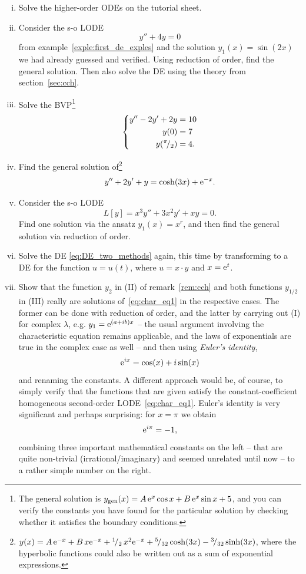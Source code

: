 \begin{exercise}
\begin{enumerate}[(i)]
		\item Solve the higher-order ODEs on the tutorial sheet.
		\item Consider the s-o LODE	\[y''+4y=0\]
		from example~\ref{exple:first_de_exples} and the solution $y_1(x)=\sin(2x)$ we had already guessed and verified. Using reduction of order, find the general solution. Then also solve the DE using the theory from section~\ref{sec:cch}.
		\item Solve the BVP\footnote{The general solution is $y_{\text{gen}}(x)= A \, \mathrm{e}^x \cos x + B \, \mathrm{e}^x \sin x + 5$, and you can verify the constants you have found for the particular solution by checking whether it satisfies the boundary conditions.} 
		\[ \left\{\begin{split}
			y''-2y'+2y & = 10 \\ y(0) & = 7 \\ y({}^{\pi}\!/_{2}) & = 4.
		\end{split}\right. \]
		\item Find the general solution of\footnote{$y(x)=A\,\mathrm{e}^{-x}+B\,x\mathrm{e}^{-x}+{}^{1}\!/_{2}\,x^2\mathrm{e}^{-x}
			+{}^{5}\!/_{32}\cosh(3x)-{}^{3}\!/_{32}\sinh(3x)$, where the hyperbolic functions could also be written out as a sum of exponential expressions.} 
		\[ y''+2y'+y=\cosh(3x)+\mathrm{e}^{-x} .\]
		\item Consider the s-o LODE
		\begin{equation}
		\label{eq:DE_two_methods}
		L[y] = x^3 y'' + 3 x^2 y' + x y = 0.
		\end{equation}
		Find one solution via the ansatz $y_1(x) = x^r$, and then find the general solution via reduction of order.
		\item Solve the DE \eqref{eq:DE_two_methods} again, this time by transforming to a DE for the function $u=u(t)$, where $u = x \cdot y$ and $x=\mathrm{e}^t$.
		\item  Show that the function $y_2$ in (II) of remark~\ref{rem:cch} and both functions $y_{1/2}$ in (III) really are solutions of~\eqref{eq:char_eq1} in the respective cases. The former can be done with reduction of order, and	the latter by carrying out (I) for complex $\lambda$, e.g. $y_1=\mathrm{e}^{(a+ib)x}$ -- the usual argument involving the characteristic equation remains applicable, and the laws of exponentials are true in the complex case as well -- and then using \emph{Euler's identity},
		\[ \mathrm{e}^{ix} = \cos(x)+i\sin(x) \]
		and renaming the constants. A different approach would be, of course, to simply verify that the functions that are given satisfy the constant-coefficient homogeneous second-order LODE~\eqref{eq:char_eq1}. Euler's identity is very significant and perhaps surprising: for $x=\pi$ we obtain
		\[ \mathrm{e}^{i\pi} = -1, \]
		combining three important mathematical constants on the left -- that are quite non-trivial (irrational/imaginary) and seemed unrelated until now -- to a rather simple number on the right.
\end{enumerate}
\end{exercise}


